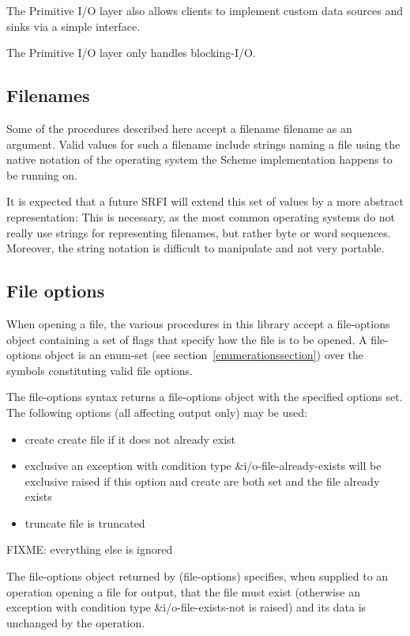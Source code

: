 The Primitive I/O layer also allows clients to implement custom data
sources and sinks via a simple interface.

The Primitive I/O layer only handles blocking-I/O.

\subsection{Filenames}

Some of the procedures described here accept a filename filename as an
argument. Valid values for such a filename include strings naming a file using
the native notation of the operating system the Scheme implementation happens
to be running on.

It is expected that a future SRFI will extend this set of values by a more
abstract representation: This is necessary, as the most common operating
systems do not really use strings for representing filenames, but rather byte
or word sequences. Moreover, the string notation is difficult to manipulate and
not very portable.

\subsection{File options}
\label{fileoptionssection}

When opening a file, the various procedures in this library accept a
{\cf file-options} object containing a set of flags that specify how
the file is to be opened. A {\cf file-options} object is an enum-set
(see section~\ref{enumerationssection}) over the symbols constituting
valid file options.

\begin{entry}{%
}
   
The {\cf file-options} syntax returns a file-options object with the
specified options set. The following options (all affecting output
only) may be used:

\begin{itemize}   
\item {\cf create} create file if it does not already exist
\item {\cf exclusive} an exception with condition type
  {\cf\&i/o-file-already-exists} will be exclusive raised if this
  option and {\cf create} are both set and the file already exists
\item {\cf truncate}
  file is truncated
\end{itemize}

FIXME: everything else is ignored

The file-options object returned by {\cf (file-options)} specifies,
when supplied to an operation opening a file for output, that the file
must exist (otherwise an exception with condition type
{\cf\&i/o-file-exists-not} is raised) and its data is unchanged by the
operation.
\end{entry}   

